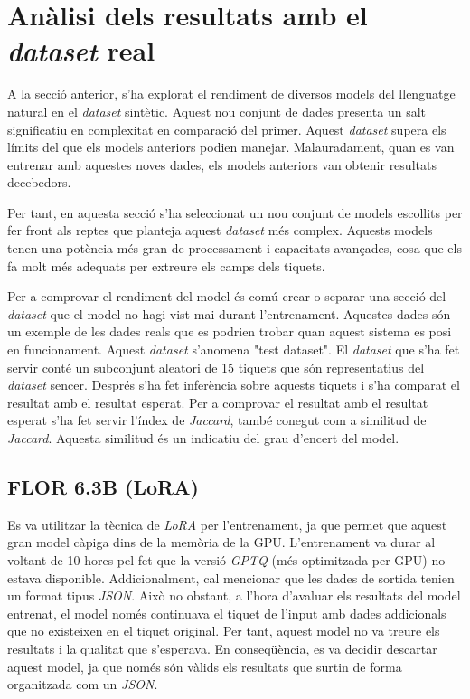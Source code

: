 \section{Anàlisi dels resultats amb el \textit{dataset} real}

A la secció anterior, s'ha explorat el rendiment de diversos models del llenguatge natural en el \textit{dataset} sintètic. Aquest nou conjunt de dades presenta un salt significatiu en complexitat en comparació del primer. Aquest \textit{dataset} supera els límits del que els models anteriors podien manejar. Malauradament, quan es van entrenar amb aquestes noves dades, els models anteriors van obtenir resultats decebedors.

Per tant, en aquesta secció s'ha seleccionat un nou conjunt de models escollits per fer front als reptes que planteja aquest \textit{dataset} més complex. Aquests models tenen una potència més gran de processament i capacitats avançades, cosa que els fa molt més adequats per extreure els camps dels tiquets.

Per a comprovar el rendiment del model és comú crear o separar una secció del \textit{dataset} que el model no hagi vist mai durant l'entrenament. Aquestes dades són un exemple de les dades reals que es podrien trobar quan aquest sistema es posi en funcionament. Aquest \textit{dataset} s'anomena "test dataset". El \textit{dataset} que s'ha fet servir conté un subconjunt aleatori de 15 tiquets que són representatius del \textit{dataset} sencer. Després s'ha fet inferència sobre aquests tiquets i s'ha comparat el resultat amb el resultat esperat. Per a comprovar el resultat amb el resultat esperat s'ha fet servir l'índex de \textit{Jaccard}, també conegut com a similitud de \textit{Jaccard}. Aquesta similitud és un indicatiu del grau d'encert del model.

\subsection{FLOR 6.3B (LoRA)}
Es va utilitzar la tècnica de \textit{LoRA} per l'entrenament, ja que permet que aquest gran model càpiga dins de la memòria de la GPU. L'entrenament va durar al voltant de 10 hores pel fet que la versió \textit{GPTQ} (més optimitzada per GPU) no estava disponible. Addicionalment, cal mencionar que les dades de sortida tenien un format tipus \textit{JSON}. Això no obstant, a l'hora d'avaluar els resultats del model entrenat, el model només continuava el tiquet de l'input amb dades addicionals que no existeixen en el tiquet original. Per tant, aquest model no va treure els resultats i la qualitat que s'esperava. En conseqüència, es va decidir descartar aquest model, ja que només són vàlids els resultats que surtin de forma organitzada com un \textit{JSON}.

